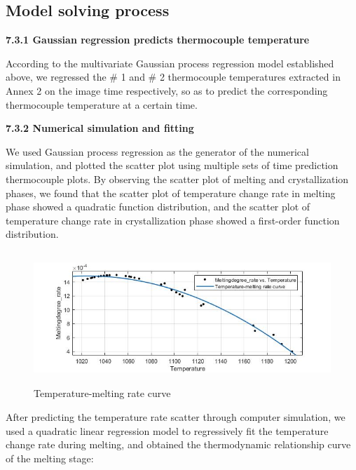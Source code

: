 \documentclass{apmcmthesis}
\begin{document}
	\subsection{Model solving process}
	
	\noindent\textbf{7.3.1 Gaussian regression predicts thermocouple temperature}
	
	According to the multivariate Gaussian process regression model established above, we regressed the \# 1 and \# 2 thermocouple temperatures extracted in Annex 2 on the image time respectively, so as to predict the corresponding thermocouple temperature at a certain time.
	
	\noindent\textbf{7.3.2 Numerical simulation and fitting}
		
		

	We used Gaussian process regression as the generator of the numerical simulation, and plotted the scatter plot using multiple sets of time prediction thermocouple plots. By observing the scatter plot of melting and crystallization phases, we found that the scatter plot of temperature change rate in melting phase showed a quadratic function distribution, and the scatter plot of temperature change rate in crystallization phase showed a first-order function distribution.
	
	\begin{figure}[htbp!]
		\centering
		\includegraphics[height=5cm]{./figures/7-2.jpg}
		\caption{Temperature-melting rate curve}
	\end{figure}
	
	
	After predicting the temperature rate scatter through computer simulation, we used a quadratic linear regression model to regressively fit the temperature change rate during melting, and obtained the thermodynamic relationship curve of the melting stage:
	
\end{document}
